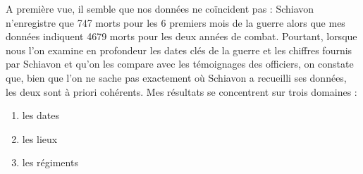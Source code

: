 A première vue, il semble que nos données ne coïncident pas  : Schiavon n'enregistre que 747 morts pour les 6 premiers mois de la guerre alors que mes données indiquent 4679 morts pour les deux années de combat. Pourtant, lorsque nous l’on examine en profondeur les dates clés de la guerre et les chiffres fournis par Schiavon et qu’on les compare avec les témoignages des officiers, on constate  que, bien que l'on ne sache pas exactement où Schiavon a recueilli ses données, les deux sont à priori cohérents. Mes résultats se concentrent sur trois domaines
: \begin{enumerate}
    \item les dates
    \item les lieux 
    \item les régiments
\end{enumerate} 

